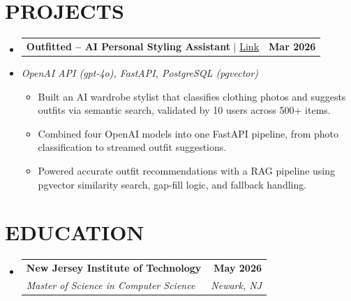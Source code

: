 \documentclass[letterpaper,11pt]{article}
\makeatletter
\newcommand{\resumeItem}[1]{
  \item\small{#1\vspace{-3pt}}
}
\newcommand{\resumeStack}[1]{
  \vspace{1pt}\item\small{\textit{#1}}\vspace{-6pt}
}
\newcommand{\resumeSubheading}[4]{
  \vspace{-3pt}\item
    \begin{tabular*}{1.0\textwidth}[t]{l@{\extracolsep{\fill}}r}
      \textbf{#1} & \textbf{\small #2} \\
      \textit{\small#3} & \textit{\small #4} \\
    \end{tabular*}\vspace{-9pt}
}
\newcommand{\resumeProjectHeading}[2]{
    \item
    \begin{tabular*}{1.001\textwidth}{l@{\extracolsep{\fill}}r}
      \small#1 & \textbf{\small #2}\\
    \end{tabular*}\vspace{-9pt}
}
\newcommand{\resumeItemListStart}{\begin{itemize}[leftmargin=0.15in, label=$\bullet$]}
\newcommand{\resumeItemListEnd}{\end{itemize}\vspace{-7pt}}
\newcommand{\resumeSubHeadingListStart}{\begin{itemize}[leftmargin=0.0in, label={}]}
\newcommand{\resumeSubHeadingListEnd}{\end{itemize}}
\makeatother
\begin{document}
\vspace{-3pt}
\section{PROJECTS}
\resumeSubHeadingListStart

\resumeProjectHeading
{\textbf{Outfitted -- AI Personal Styling Assistant} $|$ \href{https://github.com/talaviyakhushi/outfitted}{Link}}{Mar 2026}
\vspace{-9pt}
\resumeStack{OpenAI API (gpt-4o), FastAPI, PostgreSQL (pgvector)}
\resumeItemListStart
  \resumeItem{Built an AI wardrobe stylist that classifies clothing photos and suggests outfits via semantic search, validated by 10 users across 500+ items.}
  \resumeItem{Combined four OpenAI models into one FastAPI pipeline, from photo classification to streamed outfit suggestions.}
  \resumeItem{Powered accurate outfit recommendations with a RAG pipeline using pgvector similarity search, gap-fill logic, and fallback handling.}
\resumeItemListEnd

\resumeSubHeadingListEnd
\vspace{-3pt}
\section{EDUCATION}
\vspace{1pt}
\resumeSubHeadingListStart
\vspace{5pt}
\resumeSubheading
{New Jersey Institute of Technology}{May 2026}
{Master of Science in Computer Science}{Newark, NJ}
\resumeSubHeadingListEnd
\end{document}
